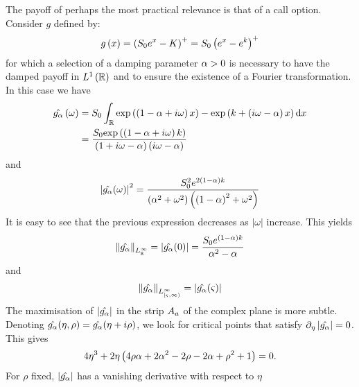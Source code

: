 \documentclass[11pt]{amsart}
\begin{document}
The payoff of perhaps the most practical relevance is that of
a call option. 
Consider $g$ defined by:
\begin{align*}
 g\left( {x} \right) = \left( {S_0 e^{x}-K} \right)^+ = S_0 \left( {e^{x}-e^{k}} \right)^+
\end{align*}
for which a selection of a damping parameter $\alpha>0$ is necessary
to have the damped payoff in $L^1 \left( {\mathbb{R}} \right)$ and to ensure the existence of a
Fourier transformation. In this case we have%
\begin{align}
\hat{g_{\alpha}}
\left( {\omega} \right) &= S_0 \int_{\mathbb{R}} \mathrm{exp}\left ( { \left( {1-\alpha + i \omega} \right)x}\right ) - \mathrm{exp}\left ( {k+\left( {i \omega- \alpha} \right)x}\right )
\textrm{d} x
\\
   &=
   \frac{ S_0 \mathrm{exp}\left ( {\left( {1- \alpha + i \omega} \right) k }\right ) }{\left( {1 + i \omega- \alpha} \right) \left( {i \omega - \alpha} \right)}
\end{align}
and
\begin{align}
 \left| {\hat{g_{\alpha}}(\omega) } \right|^2
 =
 \frac{S_0^2 e^{2 \left( {1-\alpha} \right)k}}{\left( {\alpha^2 + \omega^2 } \right) \left( {\left( {1-\alpha} \right)^2 + \omega^2} \right)}
\end{align}
It is easy to see that the previous expression decreases as $|\omega|$ increase. 
This yields
\begin{align}
\left\|\hat{g_{\alpha}}\right\|_{L^\infty_{\mathbb{R}}}
=\left| {\hat{g_{\alpha}}(0) } \right| =
\frac{S_0 e^{\left( {1-\alpha} \right)k}}{\alpha^2-\alpha}
\end{align} 
and 
\begin{align}
\left\|\hat{g_{\alpha}}\right\|_{L^\infty_{[\varsigma,\infty)}}
=\left| {\hat{g_{\alpha}}(\varsigma) } \right|
\end{align} 
The maximisation of $\left| {\hat{g_{\alpha}}} \right|$ in the strip $A_{a}$ of the complex plane is more subtle.
Denoting $\hat{g_{\alpha}}(\eta,\rho)=\hat{g_{\alpha}}(\eta + i \rho)$, we look for critical points that
satisfy 
$\partial_{\eta} \left| {\hat{g_{\alpha}}} \right|=0$. 
This gives
\begin{align}
4 \eta^3 + 2 \eta \left( {4 \rho \alpha + 2 \alpha^2 - 2 \rho -2 \alpha + \rho^2 +1} \right)=0.
\end{align}
For $\rho$ fixed, $\left| {\hat{g_{\alpha}}} \right|$ has a vanishing derivative with respect to $\eta$
\end{document}
